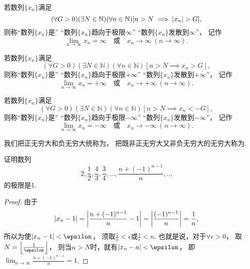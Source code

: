 \begin{definition}
若数列\(\{x_n\}\)满足\begin{equation*}
	(\forall G>0)
	(\exists N\in\mathbb{N})
	(\forall n\in\mathbb{N})
	[n > N \implies \abs{x_n} > G],
\end{equation*}
则称“数列\(\{x_n\}\)是”
“数列\(\{x_n\}\)趋向于极限\(\infty\)”
“数列\(\{x_n\}\)发散到\(\infty\)”，
记作\begin{equation*}
	\lim_{n\to\infty} x_n = \infty
	\quad\text{或}\quad
	x_n\to\infty\ (n\to\infty).
\end{equation*}

若数列\(\{x_n\}\)满足\begin{equation*}
	(\forall G>0)
	(\exists N\in\mathbb{N})
	(\forall n\in\mathbb{N})
	[n > N \implies x_n > G],
\end{equation*}
则称“数列\(\{x_n\}\)是”
“数列\(\{x_n\}\)趋向于极限\(+\infty\)”
“数列\(\{x_n\}\)发散到\(+\infty\)”，
记作\begin{equation*}
	\lim_{n\to\infty} x_n = +\infty
	\quad\text{或}\quad
	x_n\to+\infty\ (n\to\infty).
\end{equation*}

若数列\(\{x_n\}\)满足\begin{equation*}
	(\forall G>0)
	(\exists N\in\mathbb{N})
	(\forall n\in\mathbb{N})
	[n > N \implies x_n < -G],
\end{equation*}
则称“数列\(\{x_n\}\)是”
“数列\(\{x_n\}\)趋向于极限\(-\infty\)”
“数列\(\{x_n\}\)发散到\(-\infty\)”，
记作\begin{equation*}
	\lim_{n\to\infty} x_n = -\infty
	\quad\text{或}\quad
	x_n\to-\infty\ (n\to\infty).
\end{equation*}

我们把正无穷大和负无穷大统称为，
把既非正无穷大又非负无穷大的无穷大称为.
\end{definition}

\begin{example}
证明数列\begin{equation*}
	2,\frac{1}{2},\frac{4}{3},\frac{3}{4},\dotsc,\frac{n+(-1)^{n-1}}{n},\dotsc
\end{equation*}的极限是1.
\begin{proof}
由于\begin{equation*}
	\abs{x_n - 1}
	= \abs{\frac{n+(-1)^{n-1}}{n}-1}
	= \abs{\frac{(-1)^{n-1}}{n}}
	= \frac{1}{n},
\end{equation*}
所以为使\(\abs{x_n - 1} < \epsilon\)，
须取\(\frac{1}{n} < \epsilon\)或\(\frac{1}{\epsilon} < n\).
也就是说，对于\(\forall \epsilon > 0\)，
取\(N = \floor*{\frac{1}{\epsilon}}\)，
则当\(n > N\)时，就有\(\abs{x_n - a} < \epsilon\)，
即\(\lim_{n\to\infty}\frac{n+(-1)^{n-1}}{n}=1\).
\end{proof}
\end{example}


